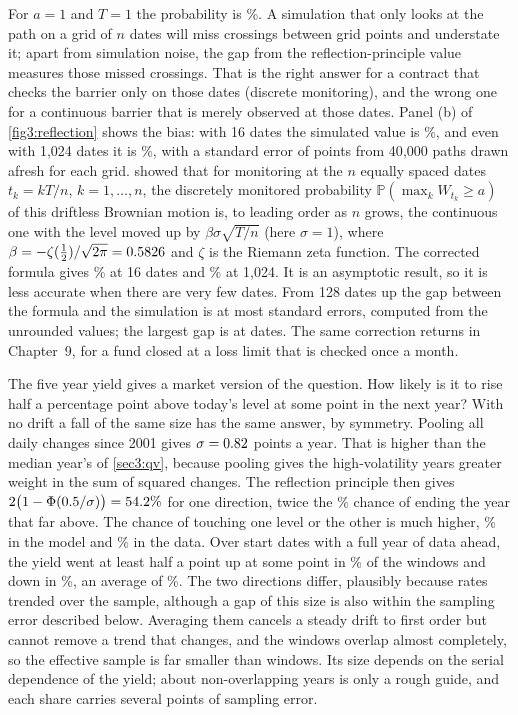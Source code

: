 \begin{chapterrefs}
For $a=1$ and $T=1$ the probability is \bmMaxCont\%. A simulation that only looks at the path on a
grid of $n$ dates will miss crossings between grid points and understate it; apart from simulation noise, the gap from
the reflection-principle value measures those missed crossings. That is the right answer
for a contract that checks the barrier only on those dates (discrete monitoring), and the wrong one for
a continuous barrier that is merely observed at those dates. Panel (b) of
\cref{fig3:reflection} shows the bias: with 16 dates the simulated value is \bmMaxMCSixteen\%, and even
with 1{,}024 dates it is \bmMaxMCBig\%, with a standard error of \bmMaxSeBig{} points from 40{,}000 paths
drawn afresh for each grid. \textcite{broadie1997} showed that for monitoring at the $n$ equally spaced dates
$t_k=kT/n$, $k=1,\dots,n$, the discretely monitored probability $\mathbb P(\max_kW_{t_k}\ge a)$ of this
driftless Brownian motion is, to leading order as $n$ grows, the continuous one with the level moved
up by $\beta\sigma\sqrt{T/n}$ (here $\sigma=1$), where
$\beta=-\zeta(\tfrac12)/\sqrt{2\pi}=0.5826$ and $\zeta$ is the Riemann zeta function. The corrected
formula gives \bmMaxBGKSixteen\% at 16 dates and \bmMaxBGKBig\% at 1{,}024. It is an asymptotic result,
so it is less accurate when there are very few dates. From 128 dates up the gap between the formula and the
simulation is at most \bmMaxZmax{} standard errors, computed from the unrounded values; the largest gap is at
\bmMaxZAt{} dates. The same correction returns in Chapter~9,
for a fund closed at a loss limit that is checked once a month.

The five year yield gives a market version of the question. How likely is it to rise half a
percentage point above today's level at some point in the next year? With no drift a fall of the same
size has the same answer, by symmetry. Pooling all daily changes since 2001 gives $\sigma=0.82$
points a year. That is higher than the median year's \canRvDailyMed{} of \cref{sec3:qv}, because
pooling gives the high-volatility years greater weight in the sum of squared changes. The
reflection principle then gives $2\bigl(1-\Phi(0.5/\sigma)\bigr)=54.2\%$ for one direction,
twice the \canEndModel\% chance of ending the year that far above. The chance of touching one level
or the other is much higher, \canHitEitherModel\% in the model and \canHitEitherEmp\% in the data. Over
\canStarts{} start dates with a full year of data ahead, the yield went at least half a point up at
some point in \canHitUp\% of the windows and down in \canHitDn\%, an average of \canHitEmp\%. The two
directions differ, plausibly because rates trended over the sample, although a gap of this size is
also within the sampling error described below. Averaging them cancels a steady drift to
first order but cannot remove a trend that changes, and the windows overlap almost completely, so the
effective sample is far smaller than \canStarts{} windows. Its size depends on the serial dependence
of the yield; about \canYearsIndep{} non-overlapping years is only a rough guide, and each
share carries several points of sampling error.


\end{chapterrefs}
